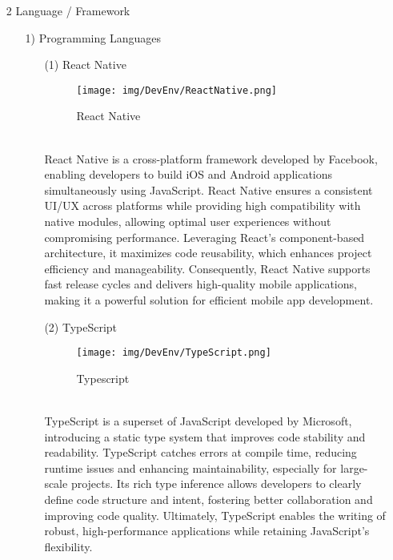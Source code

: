 \documentclass[conference]{IEEEtran}
\begin{document}
\begin{enumerate}
\item[2] Language / Framework

\begin{itemize}
\item [1)] Programming Languages
\begin{itemize}
\item [(1)] React Native\cite{ReactNative}
\begin{figure}[h]
\hspace{1.5cm}
\centering
\begin{minipage}{0.5\columnwidth}
    \texttt{[image: img/DevEnv/ReactNative.png]}
    \caption{React Native}
\end{minipage}
\end{figure} \\
React Native is a cross-platform framework developed by Facebook, enabling developers to build iOS and Android applications simultaneously using JavaScript. React Native ensures a consistent UI/UX across platforms while providing high compatibility with native modules, allowing optimal user experiences without compromising performance. Leveraging React's component-based architecture, it maximizes code reusability, which enhances project efficiency and manageability. Consequently, React Native supports fast release cycles and delivers high-quality mobile applications, making it a powerful solution for efficient mobile app development.\\

\item [(2)] TypeScript\cite{Typescript}
\begin{figure}[h]
\hspace{1cm}
\centering
\begin{minipage}{0.5\columnwidth}
    \texttt{[image: img/DevEnv/TypeScript.png]}
    \caption{Typescript}
\end{minipage}
\end{figure} \\
TypeScript is a superset of JavaScript developed by Microsoft, introducing a static type system that improves code stability and readability. TypeScript catches errors at compile time, reducing runtime issues and enhancing maintainability, especially for large-scale projects. Its rich type inference allows developers to clearly define code structure and intent, fostering better collaboration and improving code quality. Ultimately, TypeScript enables the writing of robust, high-performance applications while retaining JavaScript’s flexibility.\\


\end{itemize}
\end{itemize}
\end{enumerate}
\end{document}

